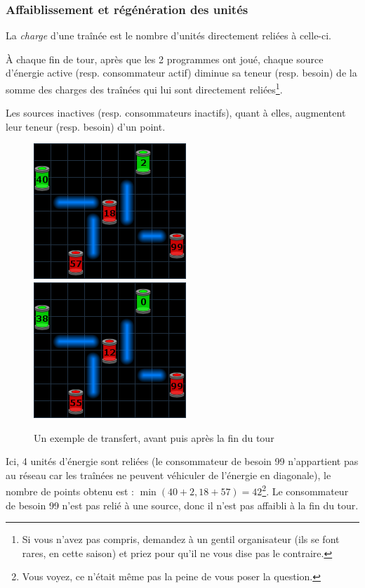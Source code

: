 \subsubsection{Affaiblissement et régénération des unités}

La \emph{charge} d'une traînée est le nombre d'unités directement reliées à celle-ci.

À chaque fin de tour, après que les 2 programmes ont joué, chaque source d'énergie active (resp. consommateur actif) diminue sa teneur (resp. besoin) de la somme des charges des traînées qui lui sont directement reliées\footnote{Si vous n'avez pas compris, demandez à un gentil organisateur (ils se font rares, en cette saison) et priez pour qu'il ne vous dise pas le contraire.}.

Les sources inactives (resp. consommateurs inactifs), quant à elles, augmentent leur teneur (resp. besoin) d'un point.

\begin{figure}[h]
\centering
\includegraphics{transfert.png}\hspace{5mm}\includegraphics{transfert2.png}
\caption{Un exemple de transfert, avant puis après la fin du tour}
\label{fig:transfert}
\end{figure}

Ici, 4 unités d'énergie sont reliées (le consommateur de besoin 99 n'appartient pas au réseau car les traînées ne peuvent véhiculer de l'énergie en diagonale), le nombre de points obtenu est : $\min(40 + 2, 18 + 57) = 42$\footnote{Vous voyez, ce n'était même pas la peine de vous poser la question.}. Le consommateur de besoin 99 n'est pas relié à une source, donc il n'est pas affaibli à la fin du tour.

